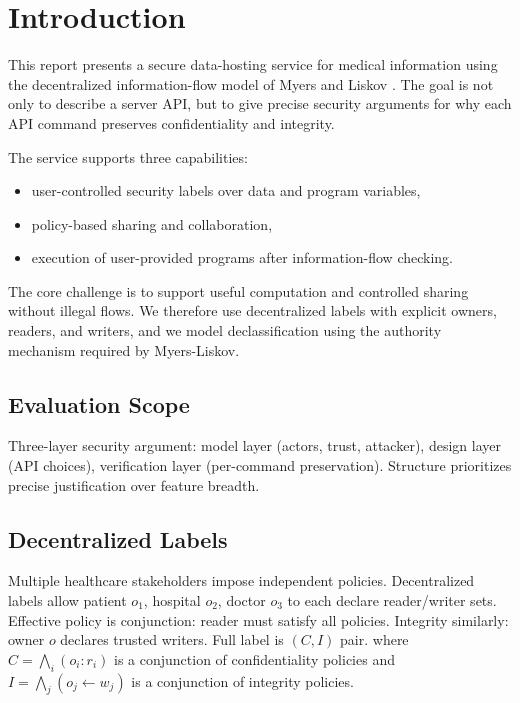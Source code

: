 \section{Introduction}

This report presents a secure data-hosting service for medical information using the decentralized information-flow model of Myers and Liskov \cite{MyersLiskov97}. The goal is not only to describe a server API, but to give precise security arguments for why each API command preserves confidentiality and integrity.

The service supports three capabilities:
\begin{itemize}
    \item user-controlled security labels over data and program variables,
    \item policy-based sharing and collaboration,
    \item execution of user-provided programs after information-flow checking.
\end{itemize}

The core challenge is to support useful computation and controlled sharing without illegal flows. We therefore use decentralized labels with explicit owners, readers, and writers, and we model declassification using the authority mechanism required by Myers-Liskov.

\subsection{Evaluation Scope}

Three-layer security argument: model layer (actors, trust, attacker), design layer (API choices), verification layer (per-command preservation). Structure prioritizes precise justification over feature breadth.

\subsection{Decentralized Labels}

Multiple healthcare stakeholders impose independent policies. Decentralized labels allow patient $o_1$, hospital $o_2$, doctor $o_3$ to each declare reader/writer sets. Effective policy is conjunction: reader must satisfy all policies. Integrity similarly: owner $o$ declares trusted writers. Full label is $(C, I)$ pair.
where $C = \bigwedge_i (o_i:r_i)$ is a conjunction of confidentiality policies and $I = \bigwedge_j (o_j \leftarrow w_j)$ is a conjunction of integrity policies.

